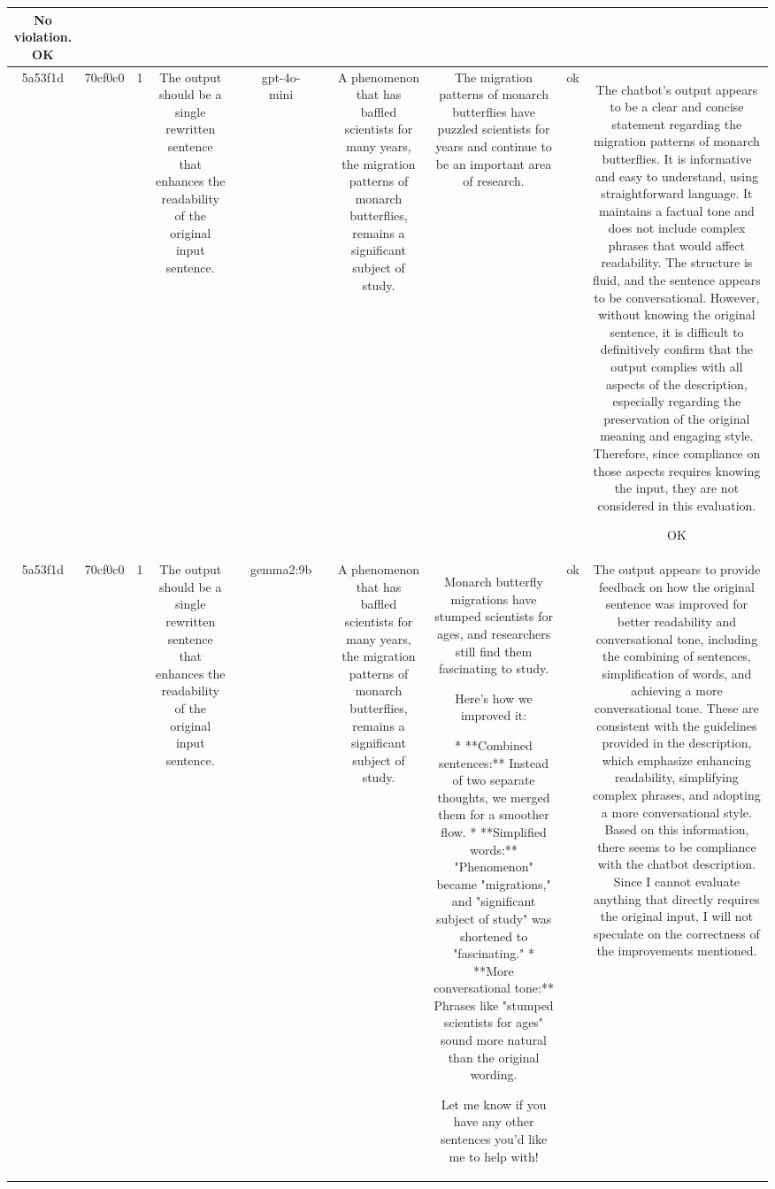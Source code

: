 \begin{table}[h!]
\begin{tabular}{|c|c|c|c|c|c|c|c|c|c|c|}
No violation.
OK\\
\hline
5a53f1d & 70cf0c0 & 1 & The output should be a single rewritten sentence that enhances the readability of the original input sentence. &  & gpt-4o-mini &  & A phenomenon that has baffled scientists for many years, the migration patterns of monarch butterflies, remains a significant subject of study. & The migration patterns of monarch butterflies have puzzled scientists for years and continue to be an important area of research. & ok & The chatbot's output appears to be a clear and concise statement regarding the migration patterns of monarch butterflies. It is informative and easy to understand, using straightforward language. It maintains a factual tone and does not include complex phrases that would affect readability. The structure is fluid, and the sentence appears to be conversational. However, without knowing the original sentence, it is difficult to definitively confirm that the output complies with all aspects of the description, especially regarding the preservation of the original meaning and engaging style. Therefore, since compliance on those aspects requires knowing the input, they are not considered in this evaluation.

OK\\
\hline
5a53f1d & 70cf0c0 & 1 & The output should be a single rewritten sentence that enhances the readability of the original input sentence. &  & gemma2:9b &  & A phenomenon that has baffled scientists for many years, the migration patterns of monarch butterflies, remains a significant subject of study. & Monarch butterfly migrations have stumped scientists for ages, and researchers still find them fascinating to study. 


Here's how we improved it:

* **Combined sentences:**  Instead of two separate thoughts, we merged them for a smoother flow.
* **Simplified words:** "Phenomenon" became "migrations," and "significant subject of study" was shortened to "fascinating."
* **More conversational tone:** Phrases like "stumped scientists for ages" sound more natural than the original wording. 



Let me know if you have any other sentences you'd like me to help with! & ok & The output appears to provide feedback on how the original sentence was improved for better readability and conversational tone, including the combining of sentences, simplification of words, and achieving a more conversational tone. These are consistent with the guidelines provided in the description, which emphasize enhancing readability, simplifying complex phrases, and adopting a more conversational style. Based on this information, there seems to be compliance with the chatbot description. Since I cannot evaluate anything that directly requires the original input, I will not speculate on the correctness of the improvements mentioned.


\end{tabular}
\end{table}
